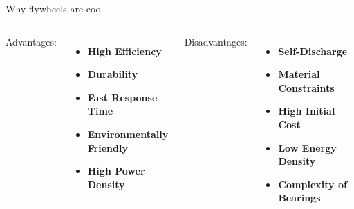 \documentclass{beamer}
\begin{document}
\begin{frame}{Why flywheels are cool}
    \begin{columns}
Advantages:
\begin{itemize}
    \item \textbf{High Efficiency} %
    \item \textbf{Durability} %
    \item \textbf{Fast Response Time} %
    \item \textbf{Environmentally Friendly} %
    \item \textbf{High Power Density} %
\end{itemize}
Disadvantages:
\begin{itemize}
    \item \textbf{Self-Discharge} %
    \item \textbf{Material Constraints} %
    \item \textbf{High Initial Cost} %
    \item \textbf{Low Energy Density} %
    \item \textbf{Complexity of Bearings} %
\end{itemize}
    \end{columns}
\end{frame}
\end{document}

